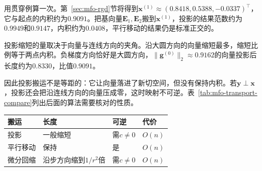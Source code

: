 用贯穿例算一次。第~\ref{sec:mfo-rgd}节将得到$\bm{x}^{(1)}\approx(0.8418,0.5388,-0.0337)^\top$，它与起点的内积约为$0.9091$。把基向量$\bm{E}_1,\bm{E}_2$搬到$\bm{x}^{(1)}$，投影的结果范数约为$0.9949$和$0.9147$，内积约为$0.0408$，平行移动的结果仍是标准正交的。

投影缩短的量取决于向量与连线方向的夹角。沿大圆方向的向量缩短最多，缩短比例等于两点内积。负梯度方向恰好是大圆方向，$\lVert\bm{g}^{(0)}\rVert_2\approx0.9162$的向量投影后长度约为$0.8330$，比值$0.9091$。

因此投影搬运不是等距的：它让向量落进了新切空间，但没有保持内积。若$\bm{y}\perp\bm{x}$，投影还会把沿连线方向的向量压成零，这时映射不可逆。表~\ref{tab:mfo-transport-compare}列出后面的算法需要核对的性质。

\begin{BookInlineTable}
 \centering
 \caption{三种搬运的性质，以球面归一化回缩为例。可逆一栏的$c=\langle\bm{x},\bm{y}\rangle$；一般流形上的平行移动要解常微分方程。}
 \label{tab:mfo-transport-compare}
 \begin{tabular}{llll}
  \toprule
  搬运 & 长度 & 可逆 & 代价\\
  \midrule
  投影 & 一般缩短 & 需$c\neq0$ & $O(n)$\\
  平行移动 & 保持 & 是 & $O(n)$\\
  微分回缩 & 沿步方向缩到$1/r^2$倍 & 需$c\neq0$ & $O(n)$\\
  \bottomrule
 \end{tabular}
\end{BookInlineTable}
